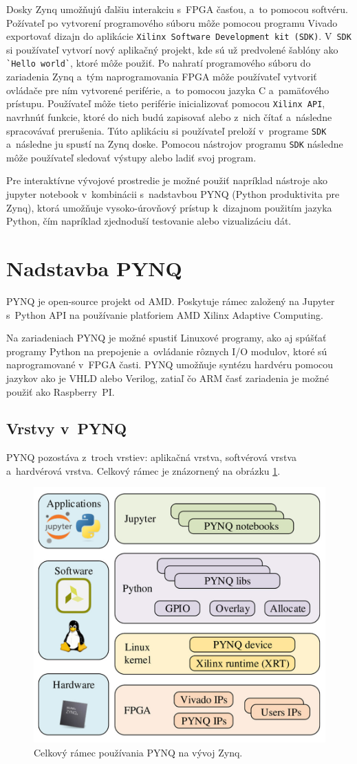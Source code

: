 Dosky Zynq umožňujú ďalšiu interakciu s~FPGA časťou, a~to pomocou softvéru. Požívateľ po vytvorení programového súboru môže pomocou programu Vivado exportovať dizajn do aplikácie \verb|Xilinx Software Development kit (SDK)|. V~\verb|SDK| si používateľ vytvorí nový aplikačný projekt, kde sú už predvolené šablóny ako \verb|`Hello world`|, ktoré môže použiť. Po nahratí programového súboru do zariadenia Zynq a~tým naprogramovania FPGA môže používateľ vytvoriť ovládače pre ním vytvorené periférie, a~to pomocou jazyka C a~pamäťového prístupu. Používateľ môže tieto periférie inicializovať pomocou \verb|Xilinx API|, navrhnúť funkcie, ktoré do nich budú zapisovať alebo z~nich čítať a~následne spracovávať prerušenia. Túto aplikáciu si používateľ preloží v~programe \verb|SDK| a~následne ju spustí na Zynq doske. Pomocou nástrojov programu \verb|SDK| následne môže používateľ sledovať výstupy alebo ladiť svoj program.~\cite{VivadoProgram, VivadoPeriferia, zynqDoc}

Pre interaktívne vývojové prostredie je možné použiť napríklad nástroje ako jupyter notebook v~kombinácii s~nadstavbou PYNQ (Python produktivita pre Zynq), ktorá umožňuje vysoko-úrovňový prístup k~dizajnom použitím jazyka Python, čím napríklad zjednoduší testovanie alebo vizualizáciu dát.~\cite{pynqDoc} 

\section{Nadstavba PYNQ}
PYNQ je open-source projekt od AMD. Poskytuje rámec založený na Jupyter s~Python API na používanie platforiem AMD Xilinx Adaptive Computing.~\cite{pynqDoc}

Na zariadeniach PYNQ je možné spustiť Linuxové programy, ako aj spúšťať programy Python na prepojenie a~ovládanie rôznych I/O modulov, ktoré sú naprogramované v~FPGA časti. PYNQ umožňuje syntézu hardvéru pomocou jazykov ako je VHLD alebo Verilog, zatiaľ čo ARM časť zariadenia je možné použiť ako Raspberry~PI.~\cite{pynqDoc}


\subsection{Vrstvy v~PYNQ}
PYNQ pozostáva z~troch vrstiev: aplikačná vrstva, softvérová vrstva a~hardvérová vrstva. Celkový rámec je znázornený na obrázku \ref{PYNQ framework}.~\cite{LiHaoran2024AFio}

\begin{figure}[t] \label{PYNQ framework}
    \centering
    \includegraphics[width=0.42\linewidth]{obrazky-figures/firefox_8RWZKxOqlq.png}
    \caption{Celkový rámec používania PYNQ na vývoj Zynq.~\cite{LiHaoran2024AFio}}
\end{figure}

